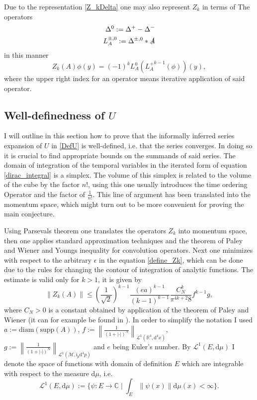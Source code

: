 \documentclass[b5paper,draft,openbib,12pt]{memoir}
\begin{document}
Due to the representation \eqref{Z_kDelta} one may also represent \(Z_k\) in terms of The operators
\begin{align}
\Delta^0:= \Delta^+-\Delta^-\\
L_A^{\pm,0}:= \Delta^{\pm,0} \ast \slashed{A}
\end{align}
in this manner
\begin{equation}
Z_k(A)\phi(y)= (-1)^{k} L^0_A \left({L_A^+}^{k-1}( \phi)\right) (y),
\end{equation}
where the upper right index for an operator means iterative application of said operator.

\subsection{Well-definedness of \(U\) }\label{sec:well-def}

I will outline in this section how to prove that the informally inferred series
expansion of \(U\) in \eqref{DefU} is well-defined, i.e. that the series
 converges. In doing so it is crucial to find appropriate bounds
on the summands of said series. 
The domain of integration of the temporal variables in the iterated form of
equation \eqref{dirac_integral} is a simplex. The volume of this simplex is
related to the volume of the cube by the factor \(n!\), using this one usually
introduces the time ordering Operator and the factor of \(\frac{1}{n!}\). This
line of argument has been translated into the momentum space, which might turn
out to be more convenient for proving the main conjecture. 

Using Parsevals theorem one translates the operators \(Z_k\) into momentum space, then one applies standard approximation techniques and the theorem of Paley and Wiener and Youngs inequality for convolution operators. Next one minimizes with respect to the arbitrary \(\epsilon\) in the equation \eqref{define_Zk}, which can be done due to the rules for changing the contour of integration of analytic functions. The estimate is valid only for \(k>1\), it is given by
\begin{equation}
\|Z_k(A)\|\le \left(\frac{1}{\sqrt{2} }\right)^{k-1} \frac{\left(e a\right)^{k-1}}{(k-1)^{k-1}} \frac{ C_N^k}{\pi^{4k+2}8}  f^{k-1}  g,
\end{equation}
where \(C_N>0\) is a constant obtained by application of the theorem of Paley and Wiener (it can for example be found in \cite{reed1975methods}). In order to simplify the notation I used \(a:=\text{diam}(\text{supp}(A))\), \(f:=\left\|\frac{1}{(1+|\cdot |)^N} \right\|_{\mathcal{L}^1(\mathbb{R}^4, \mathrm{d}^4x)}\), \(g:=\left\|\frac{1}{(1+|\cdot |)^N} \right\|_{\mathcal{L}^1(\mathcal{M},\mathfrak{i}_p \mathrm{d}^4p)} \) and \(e\) being Euler's number. By \(\mathcal{L}^1(E, \mathrm{d}\mu )\) I denote the space of functions with domain of definition \(E\) which are integrable with respect to the measure \(\mathrm{d}\mu\), i.e.
\begin{equation}
\mathcal{L}^1(E, \mathrm{d}\mu ):=\{ \psi: E\rightarrow \mathbb{C}  \mid \int_E \|\psi (x)\| \mathrm{d}\mu (x)< \infty \}.
\end{equation}
\end{document}
